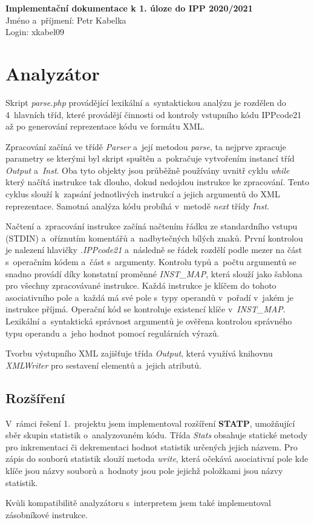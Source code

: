 \documentclass[10pt,a4paper]{article}
\begin{document}
    {\noindent\sffamily\large
        \textbf{Implementační dokumentace k 1. úloze do IPP 2020/2021} \\
        Jméno a~příjmení: Petr Kabelka \\
        Login: xkabel09
    }

    \section{Analyzátor}

    Skript \emph{parse.php} provádějící lexikální a~syntaktickou analýzu je
    rozdělen do 4~hlavních tříd, které provádějí činnosti od kontroly vstupního
    kódu IPPcode21 až po generování reprezentace kódu ve formátu XML.

    Zpracování začíná ve třídě \emph{Parser} a~její metodou \emph{parse}, ta
    nejprve zpracuje parametry se kterými byl skript spuštěn a~pokračuje
    vytvořením instancí tříd \emph{Output} a~\emph{Inst}. Oba tyto objekty
    jsou průběžně používány uvnitř cyklu \emph{while} který načítá instrukce
    tak dlouho, dokud nedojdou instrukce ke zpracování. Tento cyklus slouží
    k~zapsání jednotlivých instrukcí a jejich argumentů do XML reprezentace.
    Samotná analýza kódu probíhá v~metodě \emph{next} třídy \emph{Inst}.

    Načtení a~zpracování instrukce začíná načtením řádku ze standardního vstupu
    (STDIN) a~oříznutím komentářů a~nadbytečných bílých znaků. První kontrolou
    je nalezení hlavičky \emph{.IPPcode21} a~následně se řádek rozdělí podle
    mezer na část s~operačním kódem a~část s~argumenty. Kontrolu typů
    a~počtu argumentů se snadno provádí díky konstatní proměnné
    \emph{INST\_MAP}, která slouží jako šablona pro všechny zpracovávané
    instrukce. Každá instrukce je klíčem do tohoto asociativního pole a~každá
    má své pole s~typy operandů v~pořadí v~jakém je instrukce příjmá. Operační
    kód se kontroluje existencí klíče v~\emph{INST\_MAP}. Lexikální
    a~syntaktická správnost argumentů je ověřena kontrolou správného typu
    operandu a~jeho hodnot pomocí regulárních výrazů.

    Tvorbu výstupního XML zajišťuje třída \emph{Output}, která využívá
    knihovnu \emph{XMLWriter} pro sestavení elementů a~jejich atributů.

    \subsection{Rozšíření}

    V~rámci řešení 1.~projektu jsem implementoval rozšíření \textbf{STATP},
    umožňující sběr skupin statistik o~analyzovaném kódu. Třída \emph{Stats}
    obsahuje statické metody pro inkrementaci či dekrementaci hodnot statistik
    určených jejich názvem. Pro zápis do souborů statistik slouží metoda
    \emph{write}, která očekává asociativní pole kde klíče jsou názvy souborů
    a~hodnoty jsou pole jejichž položkami jsou názvy statistik.

    Kvůli kompatibilitě analyzátoru s~interpretem jsem také implementoval
    zásobníkové instrukce.
\end{document}
